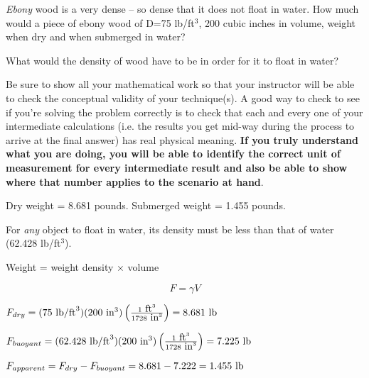 

{\it Ebony} wood is a very dense -- so dense that it does not float in water.  How much would a piece of ebony wood of D=75 lb/ft$^{3}$, 200 cubic inches in volume, weight when dry and when submerged in water?

\vskip 10pt

What would the density of wood have to be in order for it to float in water?

\vskip 10pt

Be sure to show all your mathematical work so that your instructor will be able to check the conceptual validity of your technique(s).  A good way to check to see if you're solving the problem correctly is to check that each and every one of your intermediate calculations (i.e. the results you get mid-way during the process to arrive at the final answer) has real physical meaning.  {\bf If you truly understand what you are doing, you will be able to identify the correct unit of measurement for every intermediate result and also be able to show where that number applies to the scenario at hand}.

\vskip 10pt







Dry weight = 8.681 pounds.  Submerged weight = 1.455 pounds.

\vskip 10pt

For {\it any} object to float in water, its density must be less than that of water (62.428 lb/ft$^{3}$).







Weight = weight density $\times$ volume

\vskip 10pt

$$F = \gamma V$$

\vskip 10pt

$F_{dry} = (75 \hbox{ lb/ft}^3) (200 \hbox{ in}^3) \left(1 \hbox{ ft}^3 \over 1728 \hbox{ in}^3\right) = 8.681 \hbox{ lb}$

\vskip 10pt

$F_{buoyant} = (62.428 \hbox{ lb/ft}^3) (200 \hbox{ in}^3) \left(1 \hbox{ ft}^3 \over 1728 \hbox{ in}^3\right) = 7.225 \hbox{ lb}$

\vskip 10pt

$F_{apparent} = F_{dry} - F_{buoyant} = 8.681 - 7.222 = 1.455 \hbox{ lb}$




